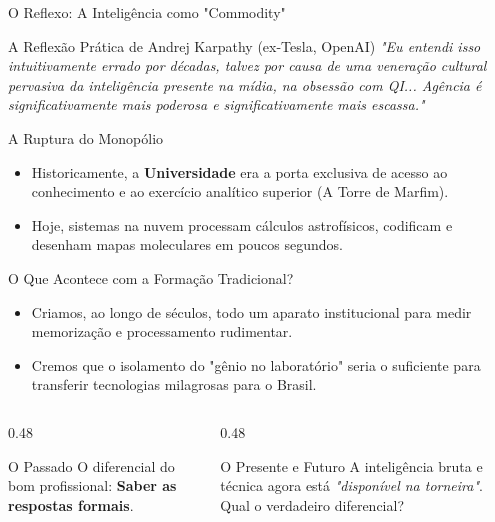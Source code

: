 \documentclass[aspectratio=169,12pt]{beamer}
\begin{document}
\begin{frame}{O Reflexo: A Inteligência como "Commodity"}
    \begin{block}{A Reflexão Prática de Andrej Karpathy (ex-Tesla, OpenAI)}
        \textit{"Eu entendi isso intuitivamente errado por décadas, talvez por causa de uma veneração cultural pervasiva da inteligência presente na mídia, na obsessão com QI... Agência é significativamente mais poderosa e significativamente mais escassa."}
    \end{block}
    
    \begin{alertblock}{A Ruptura do Monopólio}
        \begin{itemize}
            \item Historicamente, a \textbf{Universidade} era a porta exclusiva de acesso ao conhecimento e ao exercício analítico superior (A Torre de Marfim).
            \item Hoje, sistemas na nuvem processam cálculos astrofísicos, codificam e desenham mapas moleculares em poucos segundos.
        \end{itemize}
    \end{alertblock}
\end{frame}

\begin{frame}{O Que Acontece com a Formação Tradicional?}
    \begin{itemize}
        \item Criamos, ao longo de séculos, todo um aparato institucional para medir memorização e processamento rudimentar.
        \item Cremos que o isolamento do "gênio no laboratório" seria o suficiente para transferir tecnologias milagrosas para o Brasil.
    \end{itemize}
    
    \begin{columns}
        \begin{column}{0.48\textwidth}
            \begin{alertblock}{O Passado}
                O diferencial do bom profissional: \textbf{Saber as respostas formais}.
            \end{alertblock}
        \end{column}
        \begin{column}{0.48\textwidth}
            \begin{exampleblock}{O Presente e Futuro}
                A inteligência bruta e técnica agora está \textit{"disponível na torneira"}. Qual o verdadeiro diferencial?
            \end{exampleblock}
        \end{column}
    \end{columns}
\end{frame}
\end{document}
